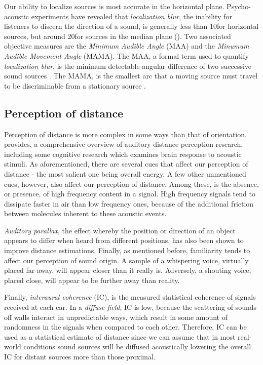Our ability to localize sources is most accurate in the horizontal plane. Psycho-acoustic experiments have revealed that \textit{localization blur}, the inability for listeners to discern the direction of a sound, is generally less than 10\textdegree for horizontal sources, but around 20\textdegree for sources in the median plane (\cite{hacihabiboglu2017perceptual}). Two associated objective measures are the \textit{Minimum Audible Angle} (MAA) and the \textit{Minumum Audible Movement Angle} (MAMA). The MAA, a formal term used to quantify \textit{localization blur}, is the minimum detectable angular difference of two successive sound sources \cite{reardon2017evaluation}. The MAMA, is the smallest arc that a moving source must travel to be discriminable from a stationary source \cite{moore1995hearing}.

\subsection{Perception of distance}

Perception of distance is more complex in some ways than that of orientation. \cite{zahorik2005auditory} provides, a comprehensive overview of auditory distance perception research, including some cognitive research which examines brain response to acoustic stimuli. As aforementioned, there are several cues that affect our perception of distance - the most salient one being overall energy. A few other unmentioned cues, however, also affect our perception of distance. Among these, is the absence, or presence, of high frequency content in a signal. High frequency signals tend to dissipate faster in air than low frequency ones, because of the additional friction between molecules inherent to these acoustic events. 

\textit{Auditory parallax}, the effect whereby the position or direction of an object appears to differ when heard from different positions, has also been shown to improve distance estimations. Finally, as mentioned before, familiarity tends to affect our perception of sound origin. A sample of a whispering voice, virtually placed far away, will appear closer than it really is. Adversely, a shouting voice, placed close, will appear to be further away than reality.

Finally, \textit{interaural coherence} (IC), is the measured statistical coherence of signals received at each ear. In a \textit{diffuse field}, IC is low, because the scattering of sounds off walls interact in unpredictable ways, which result in some amount of randomness in the signals when compared to each other. Therefore, IC can be used as a statistical estimate of distance since we can assume that in most real-world conditions sound sources will be diffused acoustically lowering the overall IC for distant sources more than those proximal.

